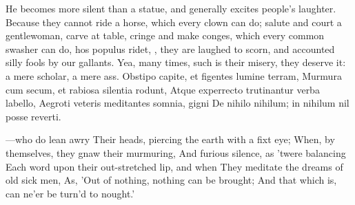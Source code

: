 {{He becomes more silent than a statue, and generally excites people's
laughter. Because they cannot ride a horse, which every clown can do;
salute and court a gentlewoman, carve at table, cringe and make conges,
which every common swasher can do, hos populus ridet, \etc{}, they
are laughed to scorn, and accounted silly fools by our gallants. Yea,
many times, such is their misery, they deserve it: a mere
scholar, a mere ass.
Obstipo capite, et figentes lumine terram,
Murmura cum secum, et rabiosa silentia rodunt,
Atque experrecto trutinantur verba labello,
Aegroti veteris meditantes somnia, gigni
De nihilo nihilum; in nihilum nil posse reverti.

---who do lean awry
Their heads, piercing the earth with a fixt eye;
When, by themselves, they gnaw their murmuring,
And furious silence, as 'twere balancing
Each word upon their out-stretched lip, and when
They meditate the dreams of old sick men,
As, 'Out of nothing, nothing can be brought;
And that which is, can ne'er be turn'd to nought.'

}}

